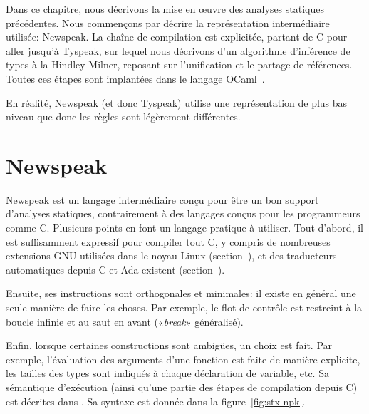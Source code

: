 Dans ce chapitre, nous décrivons la mise en œuvre des analyses statiques
précédentes. Nous commençons par décrire la représentation intermédiaire
utilisée: Newspeak. La chaîne de compilation est explicitée, partant de C pour
aller jusqu'à Tyspeak, sur lequel nous décrivons d'un algorithme d'inférence de
types à la Hindley-Milner, reposant sur l'unification et le partage de
références. Toutes ces étapes sont implantées dans le langage
OCaml~.

En réalité, Newspeak (et donc Tyspeak) utilise une représentation de plus bas
niveau que \langname donc les règles sont légèrement différentes.


\section{Newspeak}
\label{sec:npk}

Newspeak est un langage intermédiaire conçu pour être un bon support d'analyses
statiques, contrairement à des langages conçus pour les programmeurs comme C.
Plusieurs points en font un langage pratique à utiliser. Tout d'abord, il est
suffisamment expressif pour compiler tout C, y compris de nombreuses extensions
GNU utilisées dans le noyau Linux (section~\label{sec:gnuc}), et des traducteurs
automatiques depuis C et Ada existent (section~\label{sec:compil}).

Ensuite, ses instructions sont orthogonales et minimales: il existe en général
une seule manière de faire les choses. Par exemple, le flot de contrôle est
restreint à la boucle infinie et au saut en avant («\emph{break}» généralisé).

Enfin, lorsque certaines constructions sont ambigües, un choix est fait. Par
exemple, l'évaluation des arguments d'une fonction est faite de manière
explicite, les tailles des types sont indiqués à chaque déclaration de variable,
etc. Sa sémantique d'exécution (ainsi qu'une partie des étapes de compilation
depuis C) est décrites dans \cite{newspeak}. Sa syntaxe est donnée dans la
figure~\ref{fig:stx-npk}.

